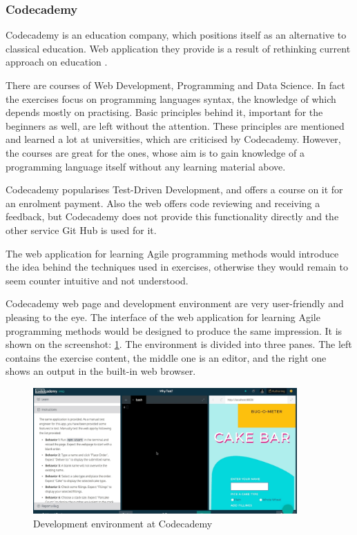 \subsubsection{Codecademy}

Codecademy is an education company, which positions itself as an alternative to classical education. Web application they provide is a result of rethinking current approach on education \cite[About]{codecademy}.

There are courses of Web Development, Programming and Data Science. In fact the exercises focus on programming languages syntax, the knowledge of which depends mostly on practising. Basic principles behind it, important for the beginners as well, are left without the attention. These principles are mentioned and learned a lot at universities, which are criticised by Codecademy. However, the courses are great for the ones, whose aim is to gain knowledge of a programming language itself without any learning material above.

Codecademy popularises Test-Driven Development, and offers a course on it for an enrolment payment. Also the web offers code reviewing and receiving a feedback, but Codecademy does not provide this functionality directly and the other service Git Hub is used for it.

The web application for learning Agile programming methods would introduce the idea behind the techniques used in exercises, otherwise they would remain to seem counter intuitive and not understood.

Codecademy web page and development environment are very user-friendly and pleasing to the eye. The interface of the web application for learning Agile programming methods would be designed to produce the same impression. It is shown on the screenshot: \ref{fig:codecademy}. The environment is divided into three panes. The left contains the exercise content, the middle one is an editor, and the right one shows an output in the built-in web browser.

\begin{figure}[h]
    \centerline{\includegraphics[width=0.9\textwidth]{images/codecademy}}
    \caption{Development environment at Codecademy}
    \label{fig:codecademy}
\end{figure}


